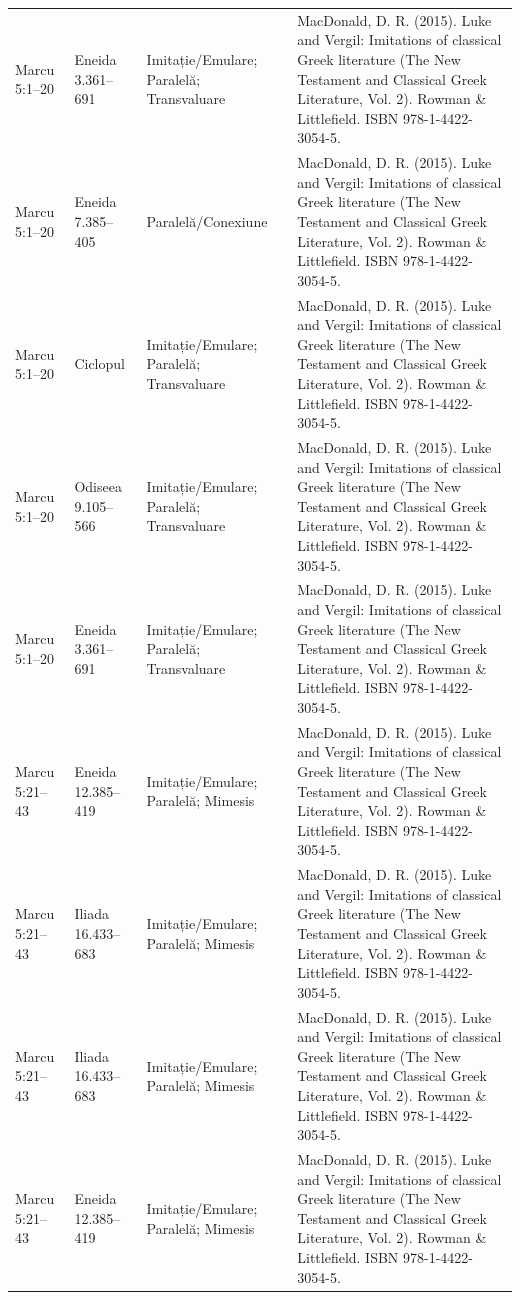 \documentclass[12pt,a4paper,twoside,openany]{book}
\begin{document}
\begin{longtable}{L{1.4cm}L{1.7cm}L{3.1cm}L{8.4cm}}
Marcu 5:1–20 & Eneida 3.361–691 & Imitație/Emulare; Paralelă; Transvaluare & MacDonald, D. R. (2015). Luke and Vergil: Imitations of classical Greek literature (The New Testament and Classical Greek Literature, Vol. 2). Rowman \& Littlefield. ISBN 978-1-4422-3054-5. \\
Marcu 5:1–20 & Eneida 7.385–405 & Paralelă/Conexiune & MacDonald, D. R. (2015). Luke and Vergil: Imitations of classical Greek literature (The New Testament and Classical Greek Literature, Vol. 2). Rowman \& Littlefield. ISBN 978-1-4422-3054-5. \\
Marcu 5:1–20 & Ciclopul & Imitație/Emulare; Paralelă; Transvaluare & MacDonald, D. R. (2015). Luke and Vergil: Imitations of classical Greek literature (The New Testament and Classical Greek Literature, Vol. 2). Rowman \& Littlefield. ISBN 978-1-4422-3054-5. \\
Marcu 5:1–20 & Odiseea 9.105–566 & Imitație/Emulare; Paralelă; Transvaluare & MacDonald, D. R. (2015). Luke and Vergil: Imitations of classical Greek literature (The New Testament and Classical Greek Literature, Vol. 2). Rowman \& Littlefield. ISBN 978-1-4422-3054-5. \\
Marcu 5:1–20 & Eneida 3.361–691 & Imitație/Emulare; Paralelă; Transvaluare & MacDonald, D. R. (2015). Luke and Vergil: Imitations of classical Greek literature (The New Testament and Classical Greek Literature, Vol. 2). Rowman \& Littlefield. ISBN 978-1-4422-3054-5. \\
Marcu 5:21–43 & Eneida 12.385–419 & Imitație/Emulare; Paralelă; Mimesis & MacDonald, D. R. (2015). Luke and Vergil: Imitations of classical Greek literature (The New Testament and Classical Greek Literature, Vol. 2). Rowman \& Littlefield. ISBN 978-1-4422-3054-5. \\
Marcu 5:21–43 & Iliada 16.433–683 & Imitație/Emulare; Paralelă; Mimesis & MacDonald, D. R. (2015). Luke and Vergil: Imitations of classical Greek literature (The New Testament and Classical Greek Literature, Vol. 2). Rowman \& Littlefield. ISBN 978-1-4422-3054-5. \\
Marcu 5:21–43 & Iliada 16.433–683 & Imitație/Emulare; Paralelă; Mimesis & MacDonald, D. R. (2015). Luke and Vergil: Imitations of classical Greek literature (The New Testament and Classical Greek Literature, Vol. 2). Rowman \& Littlefield. ISBN 978-1-4422-3054-5. \\
Marcu 5:21–43 & Eneida 12.385–419 & Imitație/Emulare; Paralelă; Mimesis & MacDonald, D. R. (2015). Luke and Vergil: Imitations of classical Greek literature (The New Testament and Classical Greek Literature, Vol. 2). Rowman \& Littlefield. ISBN 978-1-4422-3054-5. \\

\end{longtable}
\end{document}
